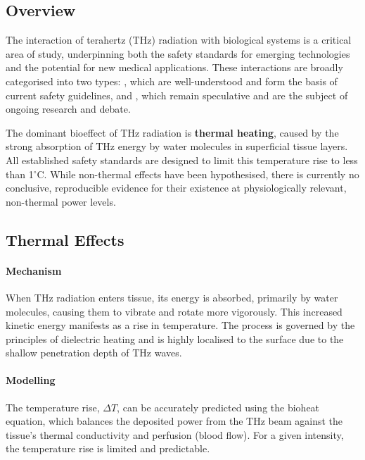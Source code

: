 \subsection{Overview}

The interaction of terahertz (THz) radiation with biological systems is a critical area of study, underpinning both the safety standards for emerging technologies and the potential for new medical applications. These interactions are broadly categorised into two types: , which are well-understood and form the basis of current safety guidelines, and , which remain speculative and are the subject of ongoing research and debate.

\begin{keyconcept}
    The dominant bioeffect of THz radiation is \textbf{thermal heating}, caused by the strong absorption of THz energy by water molecules in superficial tissue layers. All established safety standards are designed to limit this temperature rise to less than 1$^\circ$C. While non-thermal effects have been hypothesised, there is currently no conclusive, reproducible evidence for their existence at physiologically relevant, non-thermal power levels.
\end{keyconcept}


\subsection{Thermal Effects}

\paragraph{Mechanism}
When THz radiation enters tissue, its energy is absorbed, primarily by water molecules, causing them to vibrate and rotate more vigorously. This increased kinetic energy manifests as a rise in temperature. The process is governed by the principles of dielectric heating and is highly localised to the surface due to the shallow penetration depth of THz waves.

\paragraph{Modelling}
The temperature rise, $\Delta T$, can be accurately predicted using the bioheat equation, which balances the deposited power from the THz beam against the tissue's thermal conductivity and perfusion (blood flow). For a given intensity, the temperature rise is limited and predictable.

